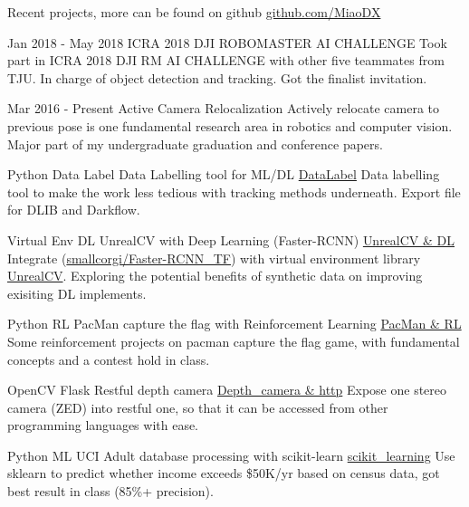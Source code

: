 \documentclass[utf8]{twentysecondcv} %
\begin{document}
\begin{twenty}

    \twentyitem
        {}
        {}        
        {Recent projects, more can be found on github}
        {\href{https://github.com/MiaoDX/}{github.com/MiaoDX}}
        {}
        {}
          
    \twentyitem
    {Jan 2018 - }
    {May 2018}
    {ICRA 2018 DJI ROBOMASTER AI CHALLENGE}
    {}
    {}
    {Took part in ICRA 2018 DJI RM AI CHALLENGE with other five teammates from TJU. In charge of object detection and tracking. Got the finalist invitation.}
    
    \twentyitem
    {Mar 2016 -}
    {Present}
    {Active Camera Relocalization}
    {}
    {}
    {Actively relocate camera to previous pose is one fundamental research area in robotics and computer vision. Major part of my undergraduate graduation and conference papers.}
    
	\twentyitem
        {Python}
		{Data Label}
        {Data Labelling tool for ML/DL}
        {\href{https://github.com/MiaoDX/DataLabel}{DataLabel}}
        {}
        {Data labelling tool to make the work less tedious with tracking methods underneath. Export file for DLIB and Darkflow.}
          
    \twentyitem
        {Virtual Env}
      	{DL}
        {UnrealCV with Deep Learning (Faster-RCNN)}
        {\href{https://github.com/MiaoDX/unrealcv_examples/}{UnrealCV \& DL}}
        {}
        {Integrate (\href{https://github.com/smallcorgi/Faster-RCNN\_TF}{smallcorgi/Faster-RCNN\_TF}) with virtual environment library \href{https://github.com/unrealcv/unrealcv}{UnrealCV}. Exploring the potential benefits of synthetic data on improving exisiting DL implements.}
                 
    \twentyitem
        {Python}
		{RL}
        {PacMan capture the flag with Reinforcement Learning}
        {\href{https://github.com/MiaoDX/hand_in_homework/tree/master/Advanced\_AI/}{PacMan \& RL}}
        {}
        {Some reinforcement projects on pacman capture the flag game, with fundamental concepts and a contest hold in class.}
        
		\twentyitem
        {OpenCV}
        {Flask}
        {Restful depth camera}
        {\href{https://github.com/MiaoDX/depth\_camera}{Depth\_camera \& http}}
        {}
        {Expose one stereo camera (ZED) into restful one, so that it can be accessed from other programming languages with ease.}

	    \twentyitem
        {Python}
		{ML}
        {UCI Adult database processing with scikit-learn}
        {\href{https://github.com/MiaoDX/scikit\_learning/}{scikit\_learning}}
        {}
        {Use sklearn to predict whether income exceeds \$50K/yr based on census data, got best result in class (85\%+ precision).}
        

\end{twenty}
\end{document}
